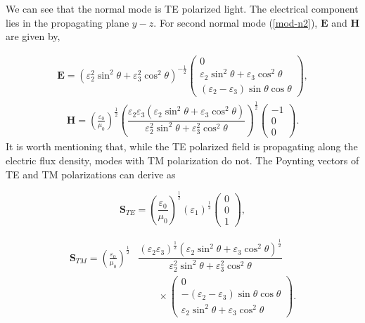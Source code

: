 \documentclass[9pt,twocolumn,twoside]{osajnl}
\begin{document}
We can see that the normal mode is TE polarized light. The electrical component lies in the propagating plane $y-z$.
 For second normal mode (\ref{mod-n2}),  $\mathbf{E}$ and $\mathbf{H}$ are given by,

 \begin{eqnarray}
\mathbf{E}=\left(\varepsilon_{2}^{2} \sin^{2}{\theta} + \varepsilon_{3}^{2}\cos^{2}{\theta}\right)^{-\frac{1}{2}}
 \begin{pmatrix}
 0\\ \varepsilon_{2} \sin^{2}{\theta} + \varepsilon_{3}\cos^{2}{\theta}\\ (\varepsilon_{2}-\varepsilon_{3})\sin{\theta}\cos{\theta}
 \end{pmatrix},
\end{eqnarray}
\begin{eqnarray}
 \mathbf{H}=\left(\frac{\varepsilon_{0}}{\mu_{0}}\right)^{\frac{1}{2}}\left(\dfrac{\varepsilon_{2}\varepsilon_{3}\left(\varepsilon_{2} \sin^{2}{\theta} + \varepsilon_{3}\cos^{2}{\theta}\right)}{\varepsilon_{2}^{2}\sin^{2}{\theta}+\varepsilon_{3}^{2}\cos^{2}{\theta}}\right)^{\frac{1}{2}}
 \begin{pmatrix}
 -1\\0\\0
 \end{pmatrix}.
 \end{eqnarray}
It is worth mentioning that, while the TE polarized field is propagating along the electric flux density, modes with TM polarization do not. The Poynting vectors of TE and TM polarizations can derive as

 \begin{equation}\label{ordinary-s}
\mathbf{S}_{TE}= \left(\frac{\varepsilon_{0}}{\mu_{0}}\right)^{\frac{1}{2}}(\varepsilon_{1})^{\frac{1}{2}}
 \begin{pmatrix}
 0\\0\\1
 \end{pmatrix},
  \end{equation}
 
  \begin{align}\label{extra.s}
 \mathbf{S}_{TM}= \left(\frac{\varepsilon_{0}}{\mu_{0}}\right)^{\frac{1}{2}} &\dfrac{(\varepsilon_{2}\varepsilon_{3})^{\frac{1}{2}}({\varepsilon_{2}\sin^{2}{\theta}+\varepsilon_{3}\cos^{2}{\theta}})^{\frac{1}{2}}}{\varepsilon_{2}^{2} \sin^{2}{\theta} + \varepsilon_{3}^{2}\cos^{2}{\theta}}\nonumber \\
&\qquad \times\begin{pmatrix}
 0\\ -(\varepsilon_{2}-\varepsilon_{3})\sin{\theta}\cos{\theta}  \\  \varepsilon_{2} \sin^{2}{\theta} + \varepsilon_{3}\cos^{2}{\theta}
 \end{pmatrix}. 
 \end{align}
 
\end{document}
